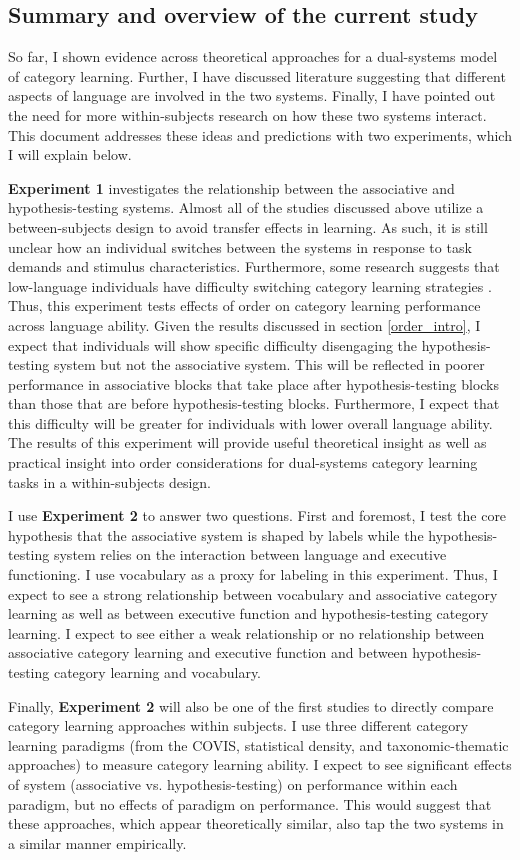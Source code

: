 \documentclass[../dissertation.tex]{subfiles}
\begin{document}
\subsection{Summary and overview of the current study}
	So far, I shown evidence across theoretical approaches for a dual-systems model of category learning. Further, I have discussed literature suggesting that different aspects of language are involved in the two systems. Finally, I have pointed out the need for more within-subjects research on how these two systems interact. This document addresses these ideas and predictions with two experiments, which I will explain below. \par
	\textbf{Experiment 1} investigates the relationship between the associative and hypothesis-testing systems. Almost all of the studies discussed above utilize a between-subjects design to avoid transfer effects in learning. As such, it is still unclear how an individual switches between the systems in response to task demands and stimulus characteristics. Furthermore, some research suggests that low-language individuals have difficulty switching category learning strategies \citep{Ryherd2019}. Thus, this experiment tests effects of order on category learning performance across language ability. Given the results discussed in section \ref{order_intro}, I expect that individuals will show specific difficulty disengaging the hypothesis-testing system but not the associative system. This will be reflected in poorer performance in associative blocks that take place after hypothesis-testing blocks than those that are before hypothesis-testing blocks. Furthermore, I expect that this difficulty will be greater for individuals with lower overall language ability. The results of this experiment will provide useful theoretical insight as well as practical insight into order considerations for dual-systems category learning tasks in a within-subjects design. \par
	I use \textbf{Experiment 2} to answer two questions. First and foremost, I test the core hypothesis that the associative system is shaped by labels while the hypothesis-testing system relies on the interaction between language and executive functioning. I use vocabulary as a proxy for labeling in this experiment. Thus, I expect to see a strong relationship between vocabulary and associative category learning as well as between executive function and hypothesis-testing category learning. I expect to see either a weak relationship or no relationship between associative category learning and executive function and between hypothesis-testing category learning and vocabulary. \par
	Finally, \textbf{Experiment 2} will also be one of the first studies to directly compare category learning approaches within subjects. I use three different category learning paradigms (from the COVIS, statistical density, and taxonomic-thematic approaches) to measure category learning ability. I expect to see significant effects of system (associative vs. hypothesis-testing) on performance within each paradigm, but no effects of paradigm on performance. This would suggest that these approaches, which appear theoretically similar, also tap the two systems in a similar manner empirically.
\end{document}
